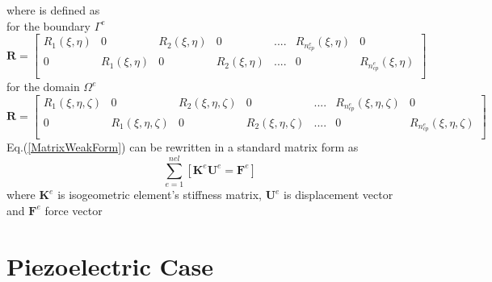 \documentclass[12pt]{article}
\begin{document}
where  is defined as \\
for the boundary $\Gamma^e$ 
\begin{equation} \label{RMatrix1}
\textbf{R} =
\begin{bmatrix}
R_1(\xi,\eta) & 0 & R_2(\xi,\eta) &0 & .... & R_{n_{cp}^e}(\xi,\eta) & 0 \\
0 &R_1(\xi,\eta) & 0 & R_2(\xi,\eta) & .... & 0 & R_{n_{cp}^e}(\xi,\eta) \\
\end{bmatrix}
\end{equation}
for the domain $\Omega^e$
\begin{equation} \label{RMatrix2}
\textbf{R} =
\begin{bmatrix}
R_1(\xi,\eta,\zeta) & 0 & R_2(\xi,\eta,\zeta) &0 & .... & R_{n_{cp}^e}(\xi,\eta,\zeta) & 0 \\
0 &R_1(\xi,\eta,\zeta) & 0 & R_2(\xi,\eta,\zeta) & .... & 0 & R_{n_{cp}^e}(\xi,\eta,\zeta) \\
\end{bmatrix}
\end{equation}
Eq.(\ref{MatrixWeakForm}) can be rewritten in a standard matrix form as
\begin{equation}
\sum_{e=1}^{nel} [\textbf{K}^e \textbf{U}^e = \textbf{F}^e] 
\end{equation}
where $\textbf{K}^e$ is isogeometric element’s stiffness matrix, $\textbf{U}^e$ is displacement vector and $\textbf{F}^e$ force vector





\section{Piezoelectric Case}
\end{document}
